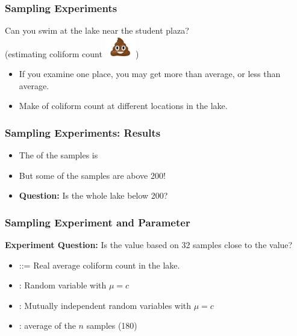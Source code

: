 \documentclass{beamer}
\begin{document}
\begin{frame}
  \frametitle{Sampling Experiments}

  {\larger
    Can you swim at the lake near the student plaza?\\
    \hfill (estimating coliform count \includegraphics[width=0.1\textwidth]{../img/poo})

    \vfill
    
    \begin{itemize}
    \item If you examine one place, you may get more than average, or
      less than average.
      \bigskip
      
    \item {} Make  of coliform count at different locations in the lake.
    \end{itemize}
  }
\end{frame}

\begin{frame}
  \frametitle{Sampling Experiments: Results}

  {\larger
    \begin{itemize}
    \item The  of the samples is 
      \bigskip

    \item But some of the samples are \alert{above 200!}
      \bigskip

    \item {\bf Question:} Is the whole lake below 200?      
    \end{itemize}
  }
\end{frame}

\begin{frame}
  \frametitle{Sampling Experiment and Parameter}

  {\bf Experiment Question:} Is the  value based
  on 32 samples close to the  value?

  \vfill
  
  \begin{itemize}
  \item {} ::= Real average coliform count in the lake.
    \medskip
    
  \item {}: Random variable with $\mu = c$
    \medskip
    
  \item {}: Mutually independent random variables
    with $\mu = c$
    \medskip
    
  \item {}: average of the $n$ samples (180)
  \end{itemize}
\end{frame}
\end{document}
